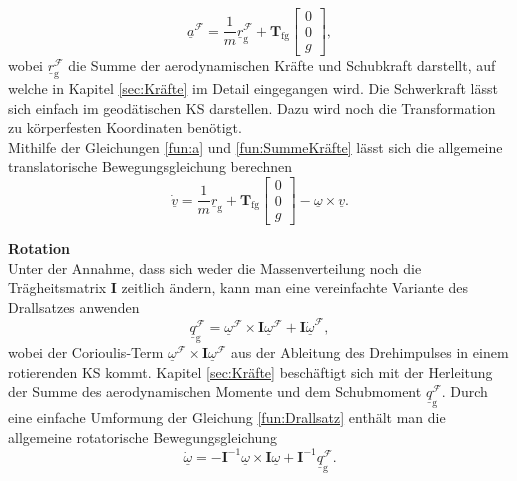 \begin{equation}
\label{fun:SummeKräfte}
\underline{a}^\mathcal{F} = \dfrac{1}{m}\underline{r}^\mathcal{F}_\mathrm{g} + \textbf{T}_\mathrm{fg}\begin{bmatrix} 
0 \\ 0 \\ g 
\end{bmatrix},
\end{equation}
wobei $\underline{r}^\mathcal{F}_\mathrm{g}$ die Summe der aerodynamischen Kräfte und Schubkraft darstellt, auf welche in Kapitel \ref{sec:Kräfte} im Detail eingegangen wird. Die Schwerkraft lässt sich einfach im geodätischen KS darstellen. Dazu wird noch die Transformation zu körperfesten Koordinaten benötigt.\\
Mithilfe der Gleichungen \eqref{fun:a} und \eqref{fun:SummeKräfte} lässt sich die allgemeine translatorische Bewegungsgleichung berechnen
\begin{equation}
\label{fund:TranslatGL}
\underline{\dot{v}} = \dfrac{1}{m}\underline{r}_\mathrm{g} + \textbf{T}_\mathrm{fg}\begin{bmatrix} 
0\\
0\\
g
\end{bmatrix} - \underline{\omega}\times\underline{v}.
\end{equation}

\textbf{Rotation}\\
Unter der Annahme, dass sich weder die Massenverteilung noch die Trägheitsmatrix $\textbf{I}$  zeitlich ändern, kann man eine vereinfachte Variante des Drallsatzes anwenden
\begin{equation}
\label{fun:Drallsatz}
\underline{q}^\mathcal{F}_\mathrm{g} =  \underline{\omega}^\mathcal{F}\times\textbf{I}\underline{\omega}^\mathcal{F} + \textbf{I}\underline{\dot{\omega}}^\mathcal{F},
\end{equation} 
wobei der Corioulis-Term $ \underline{\omega}^\mathcal{F}\times\textbf{I}\underline{\omega}^\mathcal{F}$ aus der Ableitung des Drehimpulses in einem rotierenden KS kommt. Kapitel \ref{sec:Kräfte} beschäftigt sich mit der Herleitung der Summe des aerodynamischen Momente und dem Schubmoment $\underline{q}^\mathcal{F}_\mathrm{g}$. Durch eine einfache Umformung der Gleichung \eqref{fun:Drallsatz} enthält man die allgemeine rotatorische Bewegungsgleichung
\begin{equation}
\label{fund:RotGL}
\underline{\dot{\omega}} = -\textbf{I}^{-1}\underline{\omega}\times\textbf{I}\underline{\omega} + \textbf{I}^{-1}\underline{q}^\mathcal{F}_\mathrm{g}.
\end{equation} 

